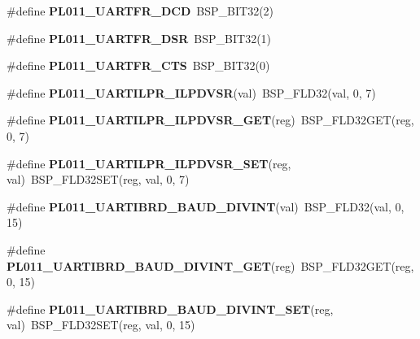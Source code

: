 \begin{DoxyCompactItemize}
\#define {\bfseries P\+L011\+\_\+\+U\+A\+R\+T\+F\+R\+\_\+\+D\+CD}~B\+S\+P\+\_\+\+B\+I\+T32(2)
\item 
\mbox{\label{arm-pl011-regs_8h_ae3ea41b6762d43fea0d86b5751d67792}} 
\#define {\bfseries P\+L011\+\_\+\+U\+A\+R\+T\+F\+R\+\_\+\+D\+SR}~B\+S\+P\+\_\+\+B\+I\+T32(1)
\item 
\mbox{\label{arm-pl011-regs_8h_a7f877387c5c7f9171ce59ce3f9edcf82}} 
\#define {\bfseries P\+L011\+\_\+\+U\+A\+R\+T\+F\+R\+\_\+\+C\+TS}~B\+S\+P\+\_\+\+B\+I\+T32(0)
\item 
\mbox{\label{arm-pl011-regs_8h_a955ce55f80c30b5e4c2da6d91ae0cef3}} 
\#define {\bfseries P\+L011\+\_\+\+U\+A\+R\+T\+I\+L\+P\+R\+\_\+\+I\+L\+P\+D\+V\+SR}(val)~B\+S\+P\+\_\+\+F\+L\+D32(val, 0, 7)
\item 
\mbox{\label{arm-pl011-regs_8h_a8778e8070d9b90bb9d8ac92cdb3e5b5a}} 
\#define {\bfseries P\+L011\+\_\+\+U\+A\+R\+T\+I\+L\+P\+R\+\_\+\+I\+L\+P\+D\+V\+S\+R\+\_\+\+G\+ET}(reg)~B\+S\+P\+\_\+\+F\+L\+D32\+G\+ET(reg, 0, 7)
\item 
\mbox{\label{arm-pl011-regs_8h_a51740044baab5daf73827404f3390a6c}} 
\#define {\bfseries P\+L011\+\_\+\+U\+A\+R\+T\+I\+L\+P\+R\+\_\+\+I\+L\+P\+D\+V\+S\+R\+\_\+\+S\+ET}(reg,  val)~B\+S\+P\+\_\+\+F\+L\+D32\+S\+ET(reg, val, 0, 7)
\item 
\mbox{\label{arm-pl011-regs_8h_aa4899bdb2313118314365ae6bfcaa961}} 
\#define {\bfseries P\+L011\+\_\+\+U\+A\+R\+T\+I\+B\+R\+D\+\_\+\+B\+A\+U\+D\+\_\+\+D\+I\+V\+I\+NT}(val)~B\+S\+P\+\_\+\+F\+L\+D32(val, 0, 15)
\item 
\mbox{\label{arm-pl011-regs_8h_abee5c435f5a2853e1407a3a76a304505}} 
\#define {\bfseries P\+L011\+\_\+\+U\+A\+R\+T\+I\+B\+R\+D\+\_\+\+B\+A\+U\+D\+\_\+\+D\+I\+V\+I\+N\+T\+\_\+\+G\+ET}(reg)~B\+S\+P\+\_\+\+F\+L\+D32\+G\+ET(reg, 0, 15)
\item 
\mbox{\label{arm-pl011-regs_8h_a7c0b28287ce2a7fb45bc0ac454995f76}} 
\#define {\bfseries P\+L011\+\_\+\+U\+A\+R\+T\+I\+B\+R\+D\+\_\+\+B\+A\+U\+D\+\_\+\+D\+I\+V\+I\+N\+T\+\_\+\+S\+ET}(reg,  val)~B\+S\+P\+\_\+\+F\+L\+D32\+S\+ET(reg, val, 0, 15)

\end{DoxyCompactItemize}

